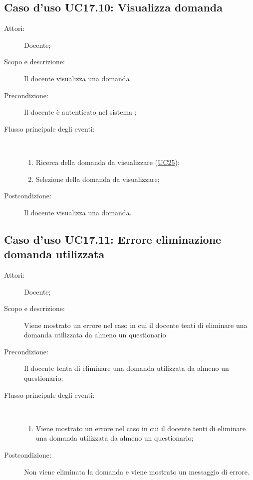 \subsection{Caso d'uso UC17.10: Visualizza domanda}\begin{description}
	\item[Attori:] Docente;
	\item[Scopo e descrizione:] Il docente visualizza una domanda
	\item[Precondizione:] Il docente è autenticato nel sistema
	;
	
	\item[Flusso principale degli eventi:] \ 
	\begin{enumerate}
		\item Ricerca della domanda da visualizzare (\hyperlink{UC25}{UC25});
		\item Selezione della domanda da visualizzare;
		
	\end{enumerate}
	\item[Postcondizione:] Il docente visualizza una domanda.
\end{description}
\hypertarget{UC17.11}{}
\subsection{Caso d'uso UC17.11: Errore eliminazione domanda utilizzata}\begin{description}
	\item[Attori:] Docente;
	\item[Scopo e descrizione:] Viene mostrato un errore nel caso in cui il docente tenti di eliminare una domanda utilizzata da almeno un questionario
	\item[Precondizione:] Il docente tenta di eliminare una domanda utilizzata da almeno un questionario;
	
	\item[Flusso principale degli eventi:] \ 
	\begin{enumerate}
		\item Viene mostrato un errore nel caso in cui il docente tenti di eliminare una domanda utilizzata da almeno un questionario;
		
	\end{enumerate}
	\item[Postcondizione:] Non viene eliminata la domanda e viene mostrato un messaggio di errore.
\end{description}
\hypertarget{UC17.12}{}
